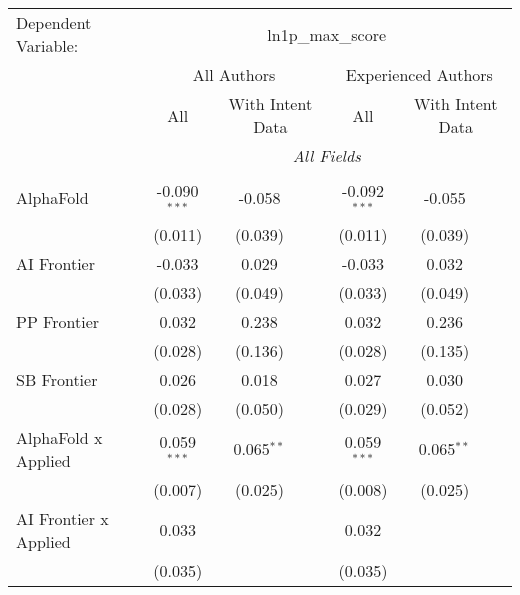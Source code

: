\begingroup
\centering
\begin{tabular}{lcccccc}
   \tabularnewline \midrule \midrule
   Dependent Variable: & \multicolumn{6}{c}{ln1p\_max\_score}\\
 & \multicolumn{3}{c}{All Authors} & \multicolumn{3}{c}{Experienced Authors} \\
\cmidrule(lr){2-4} \cmidrule(lr){5-7}
 & \multicolumn{1}{c}{All} & \multicolumn{2}{c}{With Intent Data} & \multicolumn{1}{c}{All} & \multicolumn{2}{c}{With Intent Data} \\
\cmidrule(lr){2-2} \cmidrule(lr){3-4} \cmidrule(lr){5-5} \cmidrule(lr){6-7}
 & \multicolumn{6}{c}{\textit{All Fields}} \\ \\
   AlphaFold                      & -0.090$^{***}$ & -0.058       &                & -0.092$^{***}$ & -0.055       &   \\   
                                  & (0.011)        & (0.039)      &                & (0.011)        & (0.039)      &   \\   
   AI Frontier                    & -0.033         & 0.029        &                & -0.033         & 0.032        &   \\   
                                  & (0.033)        & (0.049)      &                & (0.033)        & (0.049)      &   \\   
   PP Frontier                    & 0.032          & 0.238        &                & 0.032          & 0.236        &   \\   
                                  & (0.028)        & (0.136)      &                & (0.028)        & (0.135)      &   \\   
   SB Frontier                    & 0.026          & 0.018        &                & 0.027          & 0.030        &   \\   
                                  & (0.028)        & (0.050)      &                & (0.029)        & (0.052)      &   \\   
   AlphaFold x Applied            & 0.059$^{***}$  & 0.065$^{**}$ &                & 0.059$^{***}$  & 0.065$^{**}$ &   \\   
                                  & (0.007)        & (0.025)      &                & (0.008)        & (0.025)      &   \\   
   AI Frontier x Applied          & 0.033          &              &                & 0.032          &              &   \\   
                                  & (0.035)        &              &                & (0.035)        &              &   \\   

\end{tabular}
